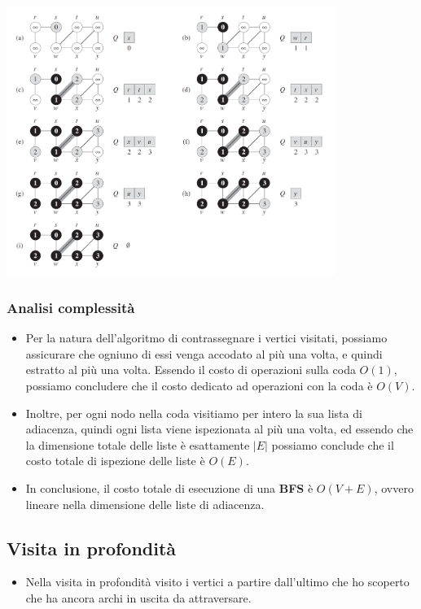 \documentclass{article}
\begin{document}
\begin{center}
  \includegraphics[width=0.8\textwidth]{bfs.png}
\end{center}
\subsubsection*{Analisi complessità}
\begin{itemize}
  \item Per la natura dell'algoritmo di contrassegnare i vertici visitati, possiamo assicurare che ogniuno di essi venga accodato al più una volta, e quindi estratto al più una volta. Essendo il costo di operazioni sulla coda \(O(1)\), possiamo concludere che il costo dedicato ad operazioni con la coda è \(O(V)\).
  \item Inoltre, per ogni nodo nella coda visitiamo per intero la sua lista di adiacenza, quindi ogni lista viene ispezionata al più una volta, ed essendo che la dimensione totale delle liste è esattamente \(|E|\) possiamo conclude che il costo totale di ispezione delle liste è \(O(E)\).
  \item In conclusione, il costo totale di esecuzione di una \textbf{BFS} è \(O(V + E)\), ovvero lineare nella dimensione delle liste di adiacenza.
\end{itemize}
\pagebreak

\subsection{Visita in profondità}
\begin{itemize}
  \item Nella visita in profondità visito i vertici a partire dall'ultimo che ho scoperto che ha ancora archi in uscita da attraversare.
\end{itemize}
\end{document}
